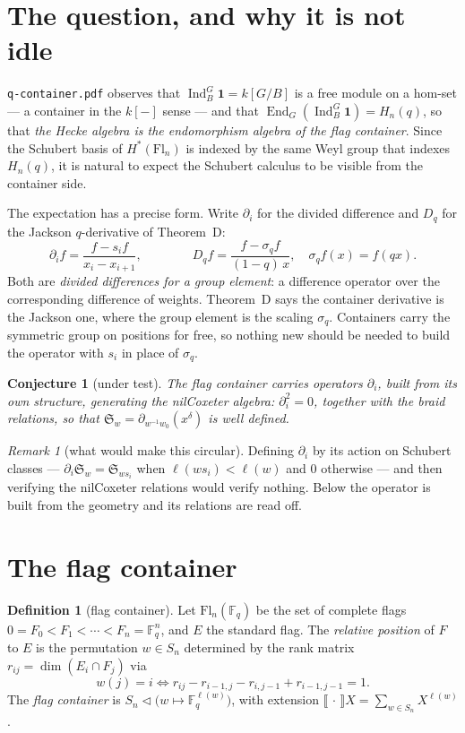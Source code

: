 \documentclass[11pt,a4paper]{article}
\newtheorem{conjecture}[theorem]{Conjecture}
\theoremstyle{definition}
\newtheorem{definition}[theorem]{Definition}
\theoremstyle{remark}
\newtheorem{remark}[theorem]{Remark}
\newcommand{\FF}{\mathbb{F}}
\newcommand{\ext}[1]{\llbracket #1 \rrbracket}
\newcommand{\con}{\triangleleft}
\DeclareMathOperator{\End}{End}
\DeclareMathOperator{\Ind}{Ind}
\newcommand{\Fl}{\mathrm{Fl}}
\newcommand{\Schub}{\mathfrak{S}}
\begin{document}
\section{The question, and why it is not idle}\label{sec:q}

\texttt{q-container.pdf} observes that $\Ind_B^G \mathbf{1} = k[G/B]$ is a free
module on a hom-set --- a container in the $k[-]$ sense --- and that
$\End_G(\Ind_B^G \mathbf{1}) = H_n(q)$, so that \emph{the Hecke algebra is the
endomorphism algebra of the flag container}. Since the Schubert basis of
$H^*(\Fl_n)$ is indexed by the same Weyl group that indexes $H_n(q)$, it is
natural to expect the Schubert calculus to be visible from the container side.

The expectation has a precise form. Write $\partial_i$ for the divided difference
and $D_q$ for the Jackson $q$-derivative of Theorem~D:
\[
  \partial_i f = \frac{f - s_i f}{x_i - x_{i+1}},
  \qquad\qquad
  D_q f = \frac{f - \sigma_q f}{(1-q)\,x}, \quad \sigma_q f(x) = f(qx).
\]
Both are \emph{divided differences for a group element}: a difference operator
over the corresponding difference of weights. Theorem~D says the container
derivative is the Jackson one, where the group element is the scaling $\sigma_q$.
Containers carry the symmetric group on positions for free, so nothing new should
be needed to build the operator with $s_i$ in place of $\sigma_q$.

\begin{conjecture}[under test]\label{conj:nil}
The flag container carries operators $\partial_i$, built from its own structure,
generating the nilCoxeter algebra: $\partial_i^2 = 0$, together with the braid
relations, so that $\Schub_w = \partial_{w^{-1}w_0}(x^\delta)$ is well defined.
\end{conjecture}

\begin{remark}[what would make this circular]
Defining $\partial_i$ by its action on Schubert classes --- $\partial_i \Schub_w
= \Schub_{ws_i}$ when $\ell(ws_i) < \ell(w)$ and $0$ otherwise --- and then
verifying the nilCoxeter relations would verify nothing. Below the operator is
built from the geometry and its relations are read off.
\end{remark}

\section{The flag container}

\begin{definition}[flag container]\label{def:flag}
Let $\Fl_n(\FF_q)$ be the set of complete flags $0 = F_0 < F_1 < \cdots < F_n =
\FF_q^n$, and $E$ the standard flag. The \emph{relative position} of $F$ to $E$
is the permutation $w \in S_n$ determined by the rank matrix
$r_{ij} = \dim(E_i \cap F_j)$ via
\[
  w(j) = i \iff r_{ij} - r_{i-1,j} - r_{i,j-1} + r_{i-1,j-1} = 1 .
\]
The \emph{flag container} is $S_n \con \bigl(w \mapsto \FF_q^{\ell(w)}\bigr)$,
with extension $\ext{\,\cdot\,}X = \sum_{w \in S_n} X^{\ell(w)}$.
\end{definition}
\end{document}

